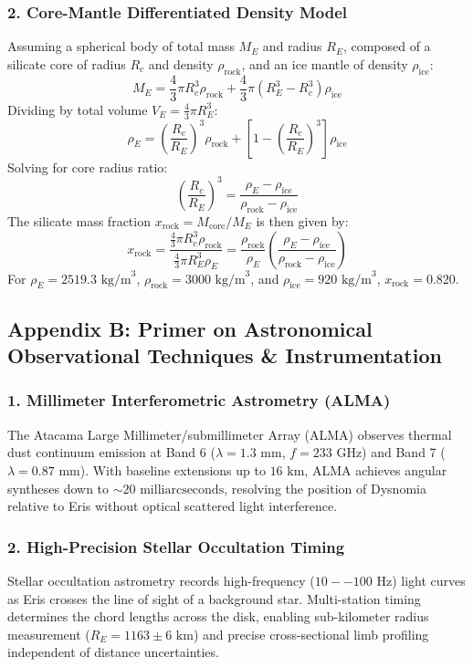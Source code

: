 \documentclass[11pt,a4paper]{article}
\begin{document}
\subsubsection*{2. Core-Mantle Differentiated Density Model}
Assuming a spherical body of total mass $M_E$ and radius $R_E$, composed of a silicate core of radius $R_c$ and density $\rho_{\text{rock}}$, and an ice mantle of density $\rho_{\text{ice}}$:
\begin{equation}
M_E = \frac{4}{3}\pi R_c^3 \rho_{\text{rock}} + \frac{4}{3}\pi (R_E^3 - R_c^3) \rho_{\text{ice}}
\end{equation}
Dividing by total volume $V_E = \frac{4}{3}\pi R_E^3$:
\begin{equation}
\rho_E = \left(\frac{R_c}{R_E}\right)^3 \rho_{\text{rock}} + \left[ 1 - \left(\frac{R_c}{R_E}\right)^3 \right] \rho_{\text{ice}}
\end{equation}
Solving for core radius ratio:
\begin{equation}
\left(\frac{R_c}{R_E}\right)^3 = \frac{\rho_E - \rho_{\text{ice}}}{\rho_{\text{rock}} - \rho_{\text{ice}}}
\end{equation}
The silicate mass fraction $x_{\text{rock}} = M_{\text{core}} / M_E$ is then given by:
\begin{equation}
x_{\text{rock}} = \frac{\frac{4}{3}\pi R_c^3 \rho_{\text{rock}}}{\frac{4}{3}\pi R_E^3 \rho_E} = \frac{\rho_{\text{rock}}}{\rho_E} \left( \frac{\rho_E - \rho_{\text{ice}}}{\rho_{\text{rock}} - \rho_{\text{ice}}} \right)
\end{equation}
For $\rho_E = 2519.3\text{ kg/m}^3$, $\rho_{\text{rock}} = 3000\text{ kg/m}^3$, and $\rho_{\text{ice}} = 920\text{ kg/m}^3$, $x_{\text{rock}} = 0.820$.

\subsection*{Appendix B: Primer on Astronomical Observational Techniques \& Instrumentation}

\subsubsection*{1. Millimeter Interferometric Astrometry (ALMA)}
The Atacama Large Millimeter/submillimeter Array (ALMA) observes thermal dust continuum emission at Band 6 ($\lambda = 1.3\text{ mm}$, $f = 233\text{ GHz}$) and Band 7 ($\lambda = 0.87\text{ mm}$). With baseline extensions up to $16\text{ km}$, ALMA achieves angular syntheses down to $\sim 20\text{ milliarcseconds}$, resolving the position of Dysnomia relative to Eris without optical scattered light interference.

\subsubsection*{2. High-Precision Stellar Occultation Timing}
Stellar occultation astrometry records high-frequency ($10--100\text{ Hz}$) light curves as Eris crosses the line of sight of a background star. Multi-station timing determines the chord lengths across the disk, enabling sub-kilometer radius measurement ($R_E = 1163 \pm 6\text{ km}$) and precise cross-sectional limb profiling independent of distance uncertainties.
\end{document}
